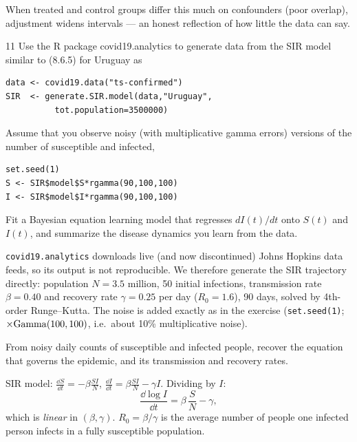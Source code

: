 \documentclass[11pt]{article}
\begin{document}
\begin{takeaway}
When treated and control groups differ this much on confounders (poor overlap), adjustment widens intervals --- an honest reflection of how little the data can say.
\end{takeaway}


\begin{problem}{11}
Use the R package covid19.analytics to generate data from the SIR model similar to (8.6.5) for Uruguay as
\begin{lstlisting}
data <- covid19.data("ts-confirmed")
SIR  <- generate.SIR.model(data,"Uruguay",
          tot.population=3500000)
\end{lstlisting}
Assume that you observe noisy (with multiplicative gamma errors) versions of the number of susceptible and infected,
\begin{lstlisting}
set.seed(1)
S <- SIR$model$S*rgamma(90,100,100)
I <- SIR$model$I*rgamma(90,100,100)
\end{lstlisting}
Fit a Bayesian equation learning model that regresses $dI(t)/dt$ onto $S(t)$ and $I(t)$, and summarize the disease dynamics you learn from the data.
\end{problem}

\begin{note}
\texttt{covid19.analytics} downloads live (and now discontinued) Johns Hopkins data feeds, so its output is not reproducible. We therefore generate the SIR trajectory directly: population $N=3.5$ million, 50 initial infections, transmission rate $\beta=0.40$ and recovery rate $\gamma=0.25$ per day ($R_0=1.6$), 90 days, solved by 4th-order Runge--Kutta. The noise is added exactly as in the exercise (\texttt{set.seed(1)}; $\times\mathrm{Gamma}(100,100)$, i.e.\ about 10\% multiplicative noise).
\end{note}

\begin{restate}
From noisy daily counts of susceptible and infected people, recover the equation that governs the epidemic, and its transmission and recovery rates.
\end{restate}

\begin{recall}
SIR model: $\frac{\dd S}{\dd t}=-\beta\frac{SI}{N}$, $\frac{\dd I}{\dd t}=\beta\frac{SI}{N}-\gamma I$. Dividing by $I$:
\[
\frac{\dd\log I}{\dd t}=\beta\,\frac SN-\gamma,
\]
which is \emph{linear} in $(\beta,\gamma)$. $R_0=\beta/\gamma$ is the average number of people one infected person infects in a fully susceptible population.
\end{recall}
\end{document}
